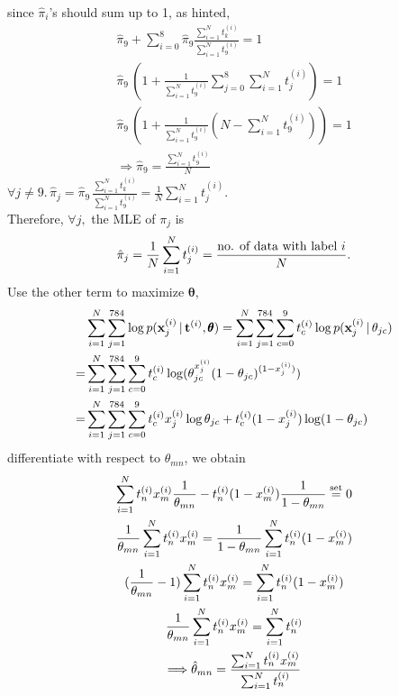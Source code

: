 \documentclass[12pt]{article}
\newcommand{\mbt}{\mb t^{(i)}}
\newcommand{\mbx}{\mb x^{(i)}}
\begin{document}
\begin{enumerate}
\begin{enumerate}
    since $\hat{\pi}_i$'s should sum up to 1, as hinted,
    \begin{gather*} \hat{\pi}_9 + 
    \sum_{i=0}^8\hat{\pi}_9\frac{\sum_{i=1}^N t_k^{(i)}}{\sum_{i=1}^N t_9^{(i)}} = 1 \\
    \hat{\pi}_9\,(1 + \frac{1}{\sum_{i=1}^N t_9^{(i)}}\sum_{j=0}^8\sum_{i=1}^N t_j^{(i)}) = 1 \\
    \hat{\pi}_9\,(1 + \frac{1}{\sum_{i=1}^N t_9^{(i)}}(N - \sum_{i=1}^N t_9^{(i)})) = 1 \\
    \Longrightarrow \hat{\pi}_9  = \frac{\sum_{i=1}^N t_9^{(i)}}{N}
    \end{gather*}
    $\forall j \neq 9. \, \hat{\pi}_j = \hat{\pi}_9 \, 
    \frac{\sum_{i=1}^N t_k^{(i)}}{\sum_{i=1}^N t_9^{(i)}} = 
      \frac{1}{N}\sum_{i=1}^N t_j^{(i)}.$ \smallskip \\
    Therefore, $\forall j,$ the MLE of $\pi_j$ is  
    \[\hat{\pi}_j = \frac{1}{N} \sum_{i=1}^N t_j^{(i)} = 
      \frac{\text{{no. of data with label $i$}}}{N}. \]
    Use the other term to maximize $\pmb \theta$,
    \begin{align*}
      &\sum_{i=1}^N\sum_{j=1}^{784} \log p(\mbx_j \vert \mbt, \pmb \theta)
      = \sum_{i=1}^N\sum_{j=1}^{784} \sum_{c=0}^9 t_c^{(i)}\log p(\mbx_j \vert \theta_{jc}) \\
      =& \sum_{i=1}^N\sum_{j=1}^{784} \sum_{c=0}^9 t_c^{(i)}
        \log (\theta_{jc}^{x_j^{(i)}}(1-\theta_{jc})^{(1-x_j^{(i)})}) \\
      =& \sum_{i=1}^N\sum_{j=1}^{784} \sum_{c=0}^9 t_c^{(i)} x_j^{(i)}\log \theta_{jc}
      + t_c^{(i)}(1 - x_j^{(i)}) \log (1 - \theta_{jc}) 
    \end{align*}
    differentiate with respect to $\theta_{mn}$, we obtain \\
    \begin{gather*}
      \sum_{i=1}^N t_n^{(i)} x_m^{(i)} \frac{1}{\theta_{mn}} - 
        t_n^{(i)} (1 - x_m^{(i)}) \frac{1}{1-\theta_{mn}} \overset{\tx{set}}{=} 0 \\
      \frac{1}{\theta_{mn}}\sum_{i=1}^N t_n^{(i)} x_m^{(i)} = 
        \frac{1}{1-\theta_{mn}}\sum_{i=1}^N t_n^{(i)} (1 - x_m^{(i)}) \\
      (\frac{1}{\theta_{mn}} - 1)\sum_{i=1}^N t_n^{(i)} x_m^{(i)} = 
        \sum_{i=1}^N t_n^{(i)} (1 - x_m^{(i)}) \\
      \frac{1}{\theta_{mn}} \sum_{i=1}^N t_n^{(i)} x_m^{(i)} = \sum_{i=1}^N t_n^{(i)} \\
      \Longrightarrow \hat{\theta}_{mn} = \frac{\sum_{i=1}^N t_n^{(i)} x_m^{(i)}}{\sum_{i=1}^N t_n^{(i)}}

\end{gather*}
\end{enumerate}
\end{enumerate}
\end{document}
